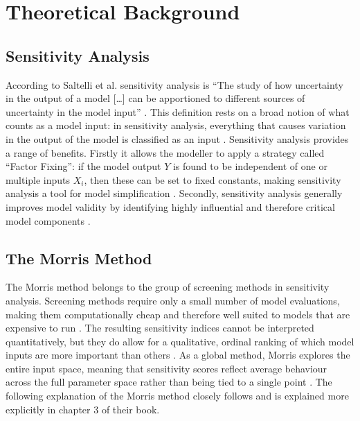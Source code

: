 \chapter{Theoretical Background}

\section{Sensitivity Analysis}

According to Saltelli et al. sensitivity analysis is ``The study of how uncertainty in the output of a model [\dots] can be apportioned to different sources of uncertainty in the model input'' \citep{saltelli_sensitivity_2004}. This definition rests on a broad notion of what counts as a model input: in sensitivity analysis, everything that causes variation in the output of the model is classified as an input \citep{saltelli_global_2007}. Sensitivity analysis provides a range of benefits. Firstly it allows the modeller to apply a strategy called ``Factor Fixing'': if the model output $Y$ is found to be independent of one or multiple inputs $X_i$, then these can be set to fixed constants,  making sensitivity analysis a tool for model simplification \citep{saltelli_global_2007}. Secondly, sensitivity analysis generally improves model validity by identifying highly influential and therefore critical model components \citep{ligmann-zielinska_spatially-explicit_2013}.

\section{The Morris Method}

The Morris method belongs to the group of screening methods in sensitivity 
analysis. Screening methods require only a small number of model evaluations, 
making them computationally cheap and therefore well suited to models that are 
expensive to run \citep{saltelli_global_2007, campolongo_effective_2007}. The 
resulting sensitivity indices cannot be interpreted quantitatively, but they do 
allow for a qualitative, ordinal ranking of which model inputs are more 
important than others \citep{campolongo_screening_2011}. As a global method, 
Morris explores the entire input space, meaning that sensitivity scores 
reflect average behaviour across the full parameter space rather than being tied 
to a single point \citep{saltelli_how_2010}. The following explanation of the 
Morris method closely follows \citep{saltelli_global_2007} and is explained more 
explicitly in chapter 3 of their book.

